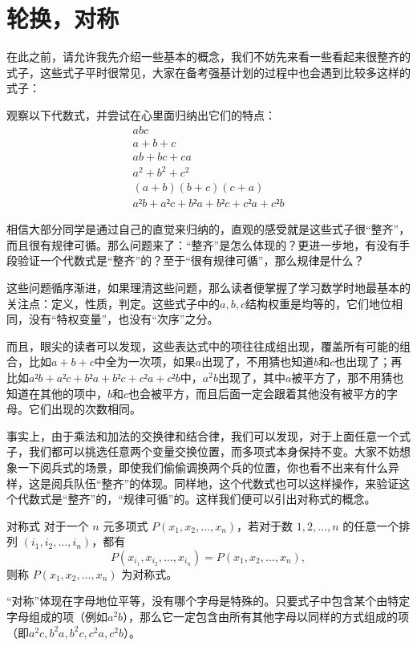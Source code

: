 \section{轮换，对称}
在此之前，请允许我先介绍一些基本的概念，我们不妨先来看一些看起来很整齐的式子，这些式子平时很常见，大家在备考强基计划的过程中也会遇到比较多这样的式子：
\begin{example}{}{}
    观察以下代数式，并尝试在心里面归纳出它们的特点：\vspace{-10pt}
    \begin{gather*}
        abc\\
        a+b+c \\
        ab+bc+ca \\
        a^2+b^2+c^2 \\
        (a+b)(b+c)(c+a)\\
        a²b + a²c + b²a + b²c + c²a + c²b
    \end{gather*}
\end{example}
\begin{solution}
    相信大部分同学是通过自己的直觉来归纳的，直观的感受就是这些式子很“整齐”，而且很有规律可循。那么问题来了：“整齐”是怎么体现的？更进一步地，有没有手段验证一个代数式是“整齐”的？至于“很有规律可循”，那么规律是什么？
    
    这些问题循序渐进，如果理清这些问题，那么读者便掌握了学习数学时地最基本的关注点：定义，性质，判定。这些式子中的$a,b,c$​​结构权重是均等的​​，它们地位相同，没有“特权变量”，也没有“次序”之分。
    
    而且，眼尖的读者可以发现，这些表达式中的项往往成组出现​​，覆盖所有可能的组合，比如$a+b+c$中全为一次项，如果$a$出现了，不用猜也知道$b$和$c$也出现了；再比如$a²b + a²c + b²a + b²c + c²a + c²b$中，$a^2b$出现了，其中$a$被平方了，那不用猜也知道在其他的项中，$b$和$c$也会被平方，而且后面一定会跟着其他没有被平方的字母。它们出现的次数相同。
    
    {\heiti 事实上，由于乘法和加法的交换律和结合律，我们可以发现，对于上面任意一个式子，我们都可以挑选任意两个变量交换位置，而多项式本身保持不变。}大家不妨想象一下阅兵式的场景，即使我们偷偷调换两个兵的位置，你也看不出来有什么异样，这是阅兵队伍“整齐”的体现。同样地，这个代数式也可以这样操作，来验证这个代数式是“整齐”的，“规律可循”的。这样我们便可以引出对称式的概念。
\end{solution}
\begin{definition}{对称式}{}
    对于一个 $n$ 元多项式 $P(x_1, x_2, \dots, x_n)$，若对于数 $1, 2, \dots, n$ 的任意一个排列 $(i_1, i_2, \dots, i_n)$，都有
    \[
    P(x_{i_1}, x_{i_2}, \dots, x_{i_n}) = P(x_1, x_2, \dots, x_n),
    \]
    则称 $P(x_1, x_2, \dots, x_n)$ 为对称式。
\end{definition}
“对称”​​ 体现在字母地位平等，没有哪个字母是特殊的。只要式子中包含某个由特定字母组成的项（例如$a^2b$），那么它一定包含由所有其他字母以同样的方式组成的项（即$a^2c,b^2a,b^2c,c^2a,c^2b$）。

